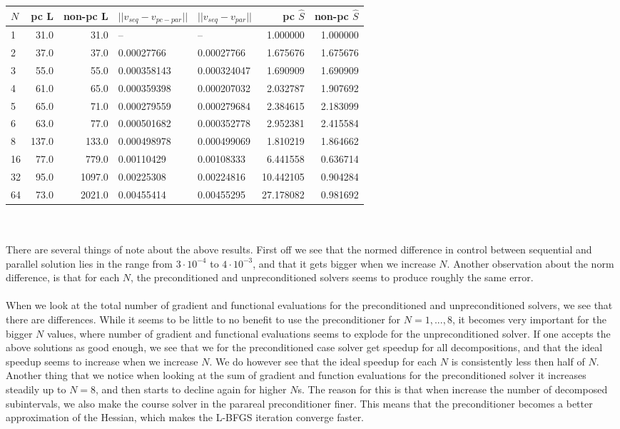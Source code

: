 \begin{tabular}{lrrllrr}
\toprule
{}$N$ &  pc L &  non-pc L &       $||v_{seq}-v_{pc-par}||$ &  $||v_{seq}-v_{par}||$  &  pc $\hat{S}$ &  non-pc $\hat{S}$ \\
\midrule
1  &     31.0 &      31.0 &           -- &           -- &    1.000000 &        1.000000 \\
2  &     37.0 &      37.0 &   0.00027766 &   0.00027766 &    1.675676 &        1.675676 \\
3  &     55.0 &      55.0 &  0.000358143 &  0.000324047 &    1.690909 &        1.690909 \\
4  &     61.0 &      65.0 &  0.000359398 &  0.000207032 &    2.032787 &        1.907692 \\
5  &     65.0 &      71.0 &  0.000279559 &  0.000279684 &    2.384615 &        2.183099 \\
6  &     63.0 &      77.0 &  0.000501682 &  0.000352778 &    2.952381 &        2.415584 \\
8  &    137.0 &     133.0 &  0.000498978 &  0.000499069 &    1.810219 &        1.864662 \\
16 &     77.0 &     779.0 &   0.00110429 &   0.00108333 &    6.441558 &        0.636714 \\
32 &     95.0 &    1097.0 &   0.00225308 &   0.00224816 &   10.442105 &        0.904284 \\
64 &     73.0 &    2021.0 &   0.00455414 &   0.00455295 &   27.178082 &        0.981692 \\
\bottomrule
\end{tabular}
\\
\\
There are several things of note about the above results. First off we see that the normed difference in control between sequential and parallel solution lies in the range from $3\cdot 10^{-4}$ to $4\cdot 10^{-3}$, and that it gets bigger when we increase $N$. Another observation about the norm difference, is that for each $N$, the preconditioned and unpreconditioned solvers seems to produce roughly the same error. 
\\
\\
When we look at the total number of gradient and functional evaluations for the preconditioned and unpreconditioned solvers, we see that there are differences. While it seems to be little to no benefit to use the preconditioner for $N=1,...,8$, it becomes very important for the bigger $N$ values, where number of gradient and functional evaluations seems to explode for the unpreconditioned solver. If one accepts the above solutions as good enough, we see that we for the preconditioned case solver get speedup for all decompositions, and that the ideal speedup seems to increase when we increase $N$. We do however see that the ideal speedup for each $N$ is consistently less then half of $N$. Another thing that we notice when looking at the sum of gradient and function evaluations for the preconditioned solver it increases steadily up to $N=8$, and then starts to decline again for higher $N$s. The reason for this is that when increase the number of decomposed subintervals, we also make the course solver in the parareal preconditioner finer. This means that the preconditioner becomes a better approximation of the Hessian, which makes the L-BFGS iteration converge faster. 

